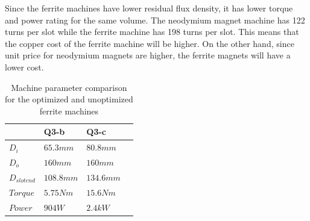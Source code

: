 \documentclass{article}
\begin{document}
Since the ferrite machines have lower residual flux density, it has lower torque and power rating for the same volume. 
The neodymium magnet machine has 122 turns per slot while the ferrite machine has 198 turns per slot. This means that the copper cost of the ferrite machine will be higher. 
On the other hand, since unit price for neodymium magnets are higher, the ferrite magnets will have a lower cost.


\begin{table}[h!] 
\begin{center}
\caption{Machine parameter comparison for the optimized and unoptimized ferrite machines}
\label{table:ComparisonFerrite}
\begin{tabular}{ |p{3cm}||p{3cm}|p{3cm}|p{3cm}|  }
 \hline
   & Q3-b	& Q3-c\\
 \hline
 $D_i$	& $65.3mm$	&	$80.8mm$\\
 \hline
 $D_o$ &	$160mm$	& $160mm$\\
 \hline
 $D_{slotend}$ &$108.8 mm$	& $134.6mm$\\
 \hline
  $Torque$ &$5.75Nm$	& $15.6Nm$\\
 \hline
  $Power$ &$904W$	& $2.4kW$\\
 \hline
\end{tabular}
\end{center}
\end{table}




%
%

\end{document}
